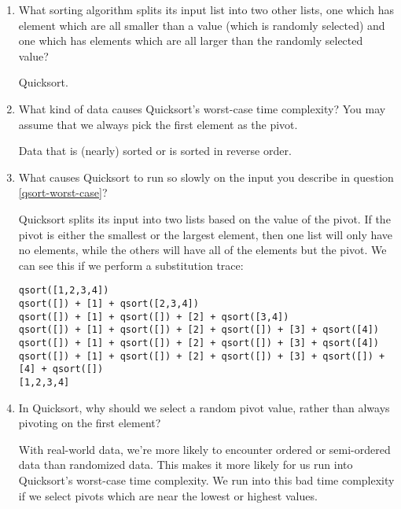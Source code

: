 \documentclass[11pt]{article}
\newenvironment{answer}{\large\lstset{basicstyle=\tiny\ttfamily}\color{white}}{}
\newenvironment{answer}{\large\lstset{basicstyle=\large\ttfamily}\color{red}}{}
\begin{document}
\begin{enumerate}
\item What sorting algorithm splits its input list into two other lists, one
      which has element which are all smaller than a value (which is randomly
      selected) and one which has elements which are all larger than the
      randomly selected value?

    \begin{answer}
    Quicksort.
    \end{answer}

\item\label{qsort-worst-case} What kind of data causes Quicksort's worst-case
      time complexity? You may assume that we always pick the first element as
      the pivot.

      \begin{answer}
      Data that is (nearly) sorted or is sorted in reverse order.
      \end{answer}

\item What causes Quicksort to run so slowly on the input you describe in
      question \ref{qsort-worst-case}?

    \begin{answer}
    Quicksort splits its input into two lists based on the value of the pivot.
    If the pivot is either the smallest or the largest element, then one list
    will only have no elements, while the others will have all of the elements
    but the pivot. We can see this if we perform a substitution trace:

\begin{verbatim}
qsort([1,2,3,4])
qsort([]) + [1] + qsort([2,3,4])
qsort([]) + [1] + qsort([]) + [2] + qsort([3,4])
qsort([]) + [1] + qsort([]) + [2] + qsort([]) + [3] + qsort([4])
qsort([]) + [1] + qsort([]) + [2] + qsort([]) + [3] + qsort([4])
qsort([]) + [1] + qsort([]) + [2] + qsort([]) + [3] + qsort([]) + [4] + qsort([])
[1,2,3,4]
\end{verbatim}
    \end{answer}

\item In Quicksort, why should we select a random pivot value, rather than always
      pivoting on the first element?

      \begin{answer}
      With real-world data, we're more likely to encounter ordered or
      semi-ordered data than randomized data. This makes it more likely for us
      run into Quicksort's worst-case time complexity. We run into this bad
      time complexity if we select pivots which are near the lowest or highest
      values.


\end{answer}
\end{enumerate}
\end{document}
